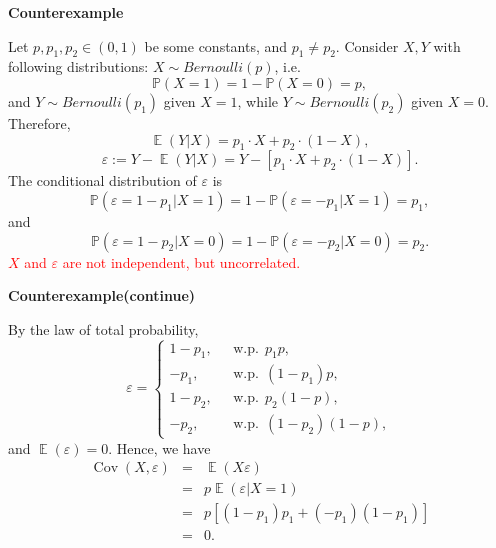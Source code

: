 \documentclass[19pt,landscaoe]{article}
\newcommand{\IP}{\mathbb{P}}
\DeclareMathOperator{\E}{\mathbb{E}}
\DeclareMathOperator{\cov}{\mathrm{Cov}}
\begin{document}


\newpage
{\LARGE\centerline{\textbf{Counterexample}}}
\vskip25pt
\begin{minipage}{.9\textwidth}
    \Large 
    Let $p,p_1,p_2\in(0,1)$ be some constants, and $p_1\ne p_2$. Consider $X,Y$ with following distributions: 
$X\sim Bernoulli(p)$, i.e. 
$$\IP(X=1)=1-\IP(X=0)=p,$$
and $Y\sim Bernoulli(p_1)$ given $X=1$, while $Y\sim Bernoulli(p_2)$ given $X=0$. Therefore, 
$$\E(Y|X)=p_1\cdot X+p_2\cdot(1-X),$$
$$\varepsilon:=Y-\E(Y|X)=Y-[p_1\cdot X+p_2\cdot(1-X)].$$
The conditional distribution of $\varepsilon$ is
$$\IP(\varepsilon=1-p_1|X=1)=1-\IP(\varepsilon=-p_1|X=1)=p_1,$$
and  
$$\IP(\varepsilon=1-p_2|X=0)=1-\IP(\varepsilon=-p_2|X=0)=p_2.$$
\textcolor{red}{$X$ and $\varepsilon$ are not independent, but uncorrelated.}
\end{minipage}

\newpage
{\LARGE\centerline{\textbf{Counterexample(continue)}}}
\vskip25pt
\begin{minipage}{.9\textwidth}
    \Large 
    By the law of total probability, 
    \begin{equation*}
        \varepsilon=\begin{cases}
            1-p_1,~~~&\mathrm{w.p.}~~p_1p,\\
            -p_1,~~~&\mathrm{w.p.}~~(1-p_1)p,\\
            1-p_2,~~~&\mathrm{w.p.}~~p_2(1-p),\\
            -p_2,~~~&\mathrm{w.p.}~~(1-p_2)(1-p),
        \end{cases}
    \end{equation*}
 and  $\E(\varepsilon)=0$. Hence, we have 
   \begin{eqnarray*}
    \cov(X,\varepsilon)&=&\E(X\varepsilon)\\
    &=&p\E(\varepsilon|X=1)\\
    &=&p[(1-p_1)p_1+(-p_1)(1-p_1)]\\
    &=&0.
   \end{eqnarray*}
\end{minipage}
\end{document}
